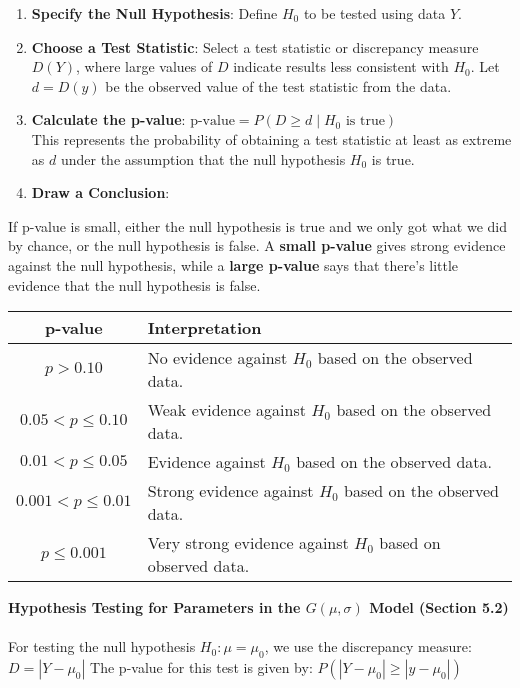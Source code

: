 \documentclass[a4paper,12pt]{article}
\begin{document}
\begin{enumerate}
    \item \textbf{Specify the Null Hypothesis}: Define \( H_0 \) to be tested using data \( Y \).
    
    \item \textbf{Choose a Test Statistic}: Select a test statistic or discrepancy measure \( D(Y) \), where large values of \( D \) indicate results less consistent with \( H_0 \). Let \( d = D(y) \) be the observed value of the test statistic from the data.
    
    \item \textbf{Calculate the p-value}:
    $\text{p-value} = P(D \geq d \mid H_0 \text{ is true})$
    \\This represents the probability of obtaining a test statistic at least as extreme as \( d \) under the assumption that the null hypothesis \( H_0 \) is true.
    
    \item \textbf{Draw a Conclusion}:
\end{enumerate}
If p-value is small, either the null hypothesis is true and we only got what we did by chance, or the null hypothesis is false. A \textbf{small p-value} gives strong evidence against the null hypothesis, while a \textbf{large p-value} says that there's little evidence that the null hypothesis is false.
\begin{table}[h!]
    \centering
    \begin{tabular}{>{\bfseries}c|p{10cm}}
        \hline
        \textbf{p-value} & \textbf{Interpretation} \\
        \hline
        \( p > 0.10 \) & No evidence against \( H_0 \) based on the observed data. \\
        \hline
        \( 0.05 < p \leq 0.10 \) & Weak evidence against \( H_0 \) based on the observed data. \\
        \hline
        \( 0.01 < p \leq 0.05 \) & Evidence against \( H_0 \) based on the observed data. \\
        \hline
        \( 0.001 < p \leq 0.01 \) & Strong evidence against \( H_0 \) based on the observed data. \\
        \hline
        \( p \leq 0.001 \) & Very strong evidence against \( H_0 \) based on observed data. \\
        \hline
    \end{tabular}
\end{table}

\textbf{Hypothesis Testing for Parameters in the $G(\mu, \sigma)$ Model (Section 5.2)}
\\
\\ For testing the null hypothesis \( H_0 : \mu = \mu_0 \), we use the discrepancy measure:
$D = |Y - \mu_0|$
The p-value for this test is given by:
$P(|Y - \mu_0| \geq |y - \mu_0|)$
\end{document}
